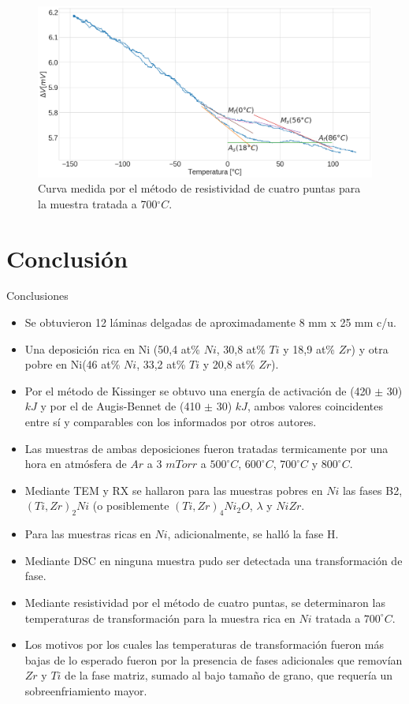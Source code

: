 \documentclass[11pt]{beamer}
\begin{document}
			\begin{frame}
				\begin{figure}[H]
					\centering
					\includegraphics[scale=0.2]{img/Resistance_700.png}
					\caption*{Curva medida por el método de resistividad de cuatro puntas para la muestra tratada a 700$^\circ C$.}
				\end{figure}
			\end{frame}
	

\section{Conclusión}
	\begin{frame}[allowframebreaks]{Conclusiones}
		\begin{itemize}
			\item Se obtuvieron 12 láminas delgadas de aproximadamente 8 mm x 25 mm c/u.
			\item Una deposición rica en Ni (50,4 at\% $Ni$, 30,8 at\% $Ti$ y 18,9 at\% $Zr$) y otra pobre en Ni(46 at\% $Ni$, 33,2 at\% $Ti$ y 20,8 at\% $Zr$).
			\item Por el método de Kissinger se obtuvo una energía de activación de (420 $\pm$ 30) $kJ$ y por el de Augis-Bennet de (410 $\pm$ 30) $kJ$, ambos valores coincidentes entre sí y comparables con los informados por otros autores.
			\item Las muestras de ambas deposiciones fueron tratadas termicamente por una hora en atmósfera de $Ar$ a 3 $mTorr$ a $500^\circ C$, $600^\circ C$, $700^\circ C$ y $800^\circ C$.
			\item Mediante TEM y RX se hallaron para las muestras pobres en $Ni$ las fases B2, $(Ti, Zr)_2Ni$ (o posiblemente $(Ti, Zr)_4Ni_2O$, $\lambda$ y $NiZr$.
			\item Para las muestras ricas en $Ni$, adicionalmente, se halló la fase H.
			\item Mediante DSC en ninguna muestra pudo ser detectada una transformación de fase.
			\item Mediante resistividad por el método de cuatro puntas, se determinaron las temperaturas de transformación para la muestra rica en $Ni$ tratada a $700^\circ C$.
			\item Los motivos por los cuales las temperaturas de transformación fueron más bajas de lo esperado fueron por la presencia de fases adicionales que removían $Zr$ y $Ti$ de la fase matriz, sumado al bajo tamaño de grano, que requería un sobreenfriamiento mayor.
		\end{itemize}
	\end{frame}
	
\end{document}
